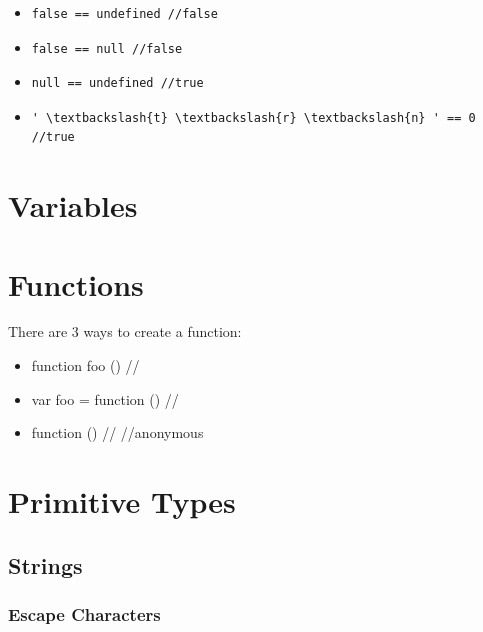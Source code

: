 \documentclass {article}
\begin{document}
		\begin{itemize}
			\item 
\begin{lstlisting} 
false == undefined //false
\end{lstlisting} 

			\item 
\begin{lstlisting} 
false == null //false
\end{lstlisting} 

			\item 
\begin{lstlisting} 
null == undefined //true
\end{lstlisting} 
			\item 
\begin{lstlisting} 
' \textbackslash{t} \textbackslash{r} \textbackslash{n} ' == 0 //true
\end{lstlisting} 

		\end{itemize}

\section{Variables}

\section{Functions}
	There are 3 ways to create a function: 
	\begin{itemize}
		\item function foo () /{/}
		\item var foo = function () /{/}
		\item function () /{/} //anonymous
	\end{itemize}


\section{Primitive Types}
	\subsection{Strings}
			\subsubsection{Escape Characters}
\end{document}
